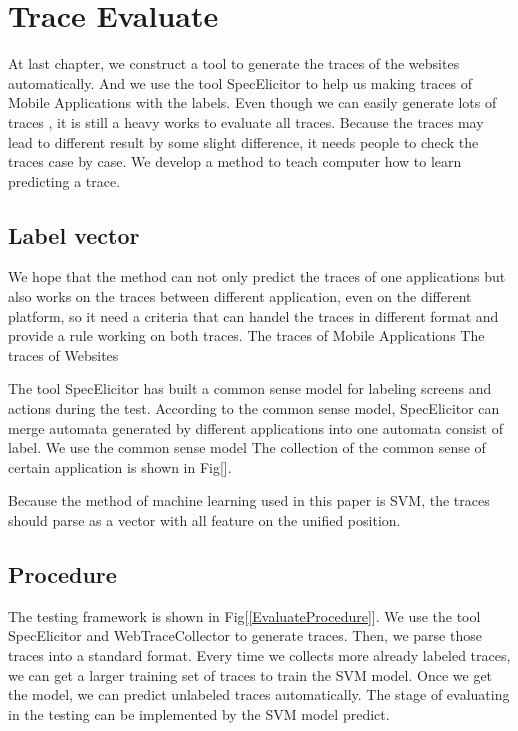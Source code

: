 
\chapter{Trace Evaluate}\label{ch:traceEvaluate}

At last chapter, we construct a tool to generate the traces of the websites automatically.
And we use the tool SpecElicitor to help us making traces of Mobile Applications with the labels.
Even though we can easily generate lots of traces ,
it is still a heavy works to evaluate all traces.
Because the traces may lead to different result by some slight difference,
it needs people to check the traces case by case.
We develop a method to teach computer how to learn predicting a trace.


\section{Label vector}

We hope that the method can not only predict the traces of one applications but also works on the traces between different application, even on the different platform,
so it need a criteria that can handel the traces in different format and provide a rule working on both traces.
The traces of Mobile Applications
The traces of Websites

The tool SpecElicitor has built a common sense model for labeling screens and actions during the test.
According to the common sense model, SpecElicitor can merge automata generated by different applications into one automata consist of label.
We use the common sense model 
The collection of the common sense of certain application is shown in Fig[].


Because the method of machine learning used in this paper is SVM,
the traces should parse as a vector with all feature on the unified position.



\clearpage

\section{Procedure}

The testing framework is shown in Fig[\ref{EvaluateProcedure}].
We use the tool SpecElicitor and WebTraceCollector to generate traces.
Then, we parse those traces into a standard format.
Every time we collects more already labeled traces,
we can get a larger training set of traces to train the SVM model.
Once we get the model, we can predict unlabeled traces automatically.
The stage of evaluating in the testing can be implemented by the SVM model predict.


